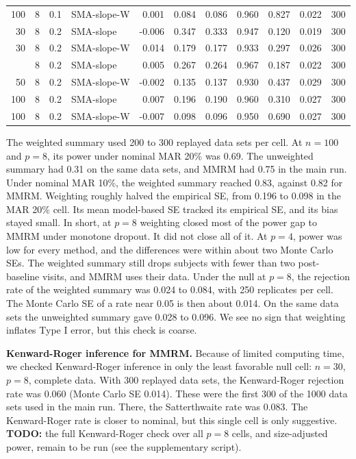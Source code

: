 \documentclass[
  11pt,
]{article}
\begin{document}
\begin{table}[!h]
{\begin{tabular}[t]{rrrlrrrrrrr}
100 & 8 & 0.1 & SMA-slope-W & 0.001 & 0.084 & 0.086 & 0.960 & 0.827 & 0.022 & 300\\
30 & 8 & 0.2 & SMA-slope & -0.006 & 0.347 & 0.333 & 0.947 & 0.120 & 0.019 & 300\\
30 & 8 & 0.2 & SMA-slope-W & 0.014 & 0.179 & 0.177 & 0.933 & 0.297 & 0.026 & 300\\
\addlinespace
50 & 8 & 0.2 & SMA-slope & 0.005 & 0.267 & 0.264 & 0.967 & 0.187 & 0.022 & 300\\
50 & 8 & 0.2 & SMA-slope-W & -0.002 & 0.135 & 0.137 & 0.930 & 0.437 & 0.029 & 300\\
100 & 8 & 0.2 & SMA-slope & 0.007 & 0.196 & 0.190 & 0.960 & 0.310 & 0.027 & 300\\
100 & 8 & 0.2 & SMA-slope-W & -0.007 & 0.098 & 0.096 & 0.950 & 0.690 & 0.027 & 300\\
\bottomrule
\end{tabular}}
\end{table}

The weighted summary used 200 to 300
replayed data sets per cell. At \(n = 100\) and \(p = 8\), its power
under nominal MAR 20\% was 0.69. The
unweighted summary had 0.31 on the same
data sets, and MMRM had 0.75 in the main run. Under
nominal MAR 10\%, the weighted summary reached
0.83, against 0.82 for
MMRM. Weighting roughly halved the empirical SE, from
0.196 to
0.098 in the MAR 20\%
cell. Its mean model-based SE tracked its empirical SE, and its
bias stayed small. In short, at \(p = 8\) weighting closed most
of the power gap to MMRM under monotone dropout. It did not
close all of it. At \(p = 4\), power was low for every method,
and the differences were within about two Monte Carlo SEs.
The weighted summary still drops subjects with fewer than two
post-baseline visits, and MMRM uses their data.
Under the null at \(p = 8\), the rejection rate of the weighted summary was 0.024 to 0.084, with 250 replicates per cell. The Monte Carlo SE of a rate near 0.05 is then about 0.014. On the same data sets the unweighted summary gave 0.028 to 0.096. We see no sign that weighting inflates Type I error, but this check is coarse.

\textbf{Kenward-Roger inference for MMRM.} Because of limited
computing time, we checked Kenward-Roger inference in only the
least favorable null cell: \(n = 30\), \(p = 8\), complete data.
With 300 replayed data sets, the Kenward-Roger
rejection rate was 0.060 (Monte
Carlo SE 0.014). These were
the first 300 of the 1000 data sets used in
the main run. There, the Satterthwaite rate was
0.083. The Kenward-Roger rate is
closer to nominal, but this single cell is only suggestive.
\textbf{TODO:} the full
Kenward-Roger check over all \(p = 8\) cells, and size-adjusted
power, remain to be run (see the supplementary script).
\end{document}
